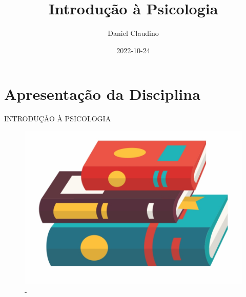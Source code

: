 \documentclass[
]{book}
\title{Introdução à Psicologia}
\author{Daniel Claudino}
\date{2022-10-24}
\begin{document}
\maketitle

{
\setcounter{tocdepth}{1}
\tableofcontents
}
\hypertarget{apresentauxe7uxe3o-da-disciplina}{%
\chapter{Apresentação da Disciplina}\label{apresentauxe7uxe3o-da-disciplina}}

INTRODUÇÃO À PSICOLOGIA

\begin{figure}

{\centering \includegraphics[width=0.5\linewidth]{figuras/LIVRO-GENERICO} 

}

\caption{-}\label{fig:unnamed-chunk-1}
\end{figure}
\end{document}
